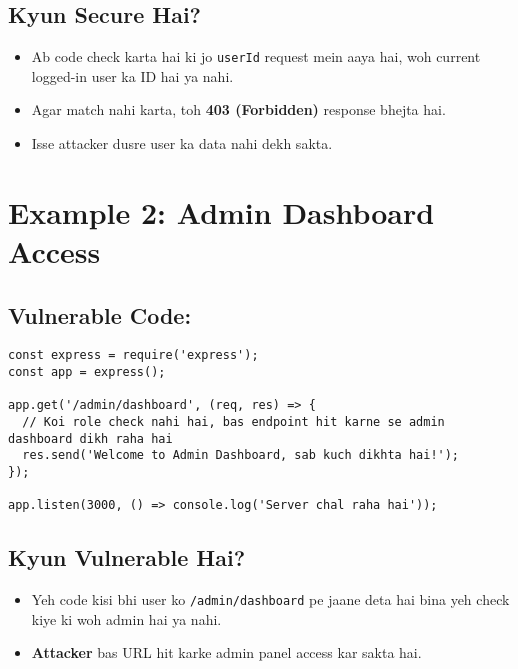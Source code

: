\documentclass[a4paper, 12pt]{article}
\begin{document}
\subsection{Kyun Secure Hai?}
\begin{itemize}
    \item Ab code check karta hai ki jo \texttt{userId} request mein aaya hai, woh current logged-in user ka ID hai ya nahi.
    \item Agar match nahi karta, toh \textbf{\color{importantred}403 (Forbidden)} response bhejta hai.
    \item Isse attacker dusre user ka data nahi dekh sakta.
\end{itemize}

\section{Example 2: Admin Dashboard Access}
\subsection{Vulnerable Code:}
\begin{lstlisting}[caption={Vulnerable Admin Dashboard}]
const express = require('express');
const app = express();

app.get('/admin/dashboard', (req, res) => {
  // Koi role check nahi hai, bas endpoint hit karne se admin dashboard dikh raha hai
  res.send('Welcome to Admin Dashboard, sab kuch dikhta hai!');
});

app.listen(3000, () => console.log('Server chal raha hai'));
\end{lstlisting}

\subsection{Kyun Vulnerable Hai?}
\begin{itemize}
    \item Yeh code kisi bhi user ko \texttt{/admin/dashboard} pe jaane deta hai bina yeh check kiye ki woh admin hai ya nahi.
    \item \textbf{\color{importantred}Attacker} bas URL hit karke admin panel access kar sakta hai.
\end{itemize}
\end{document}
